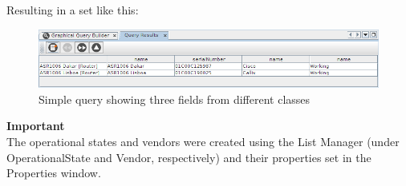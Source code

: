 \documentclass[a4paper]{article}
\begin{document}
	Resulting in a set like this:
	\begin{figure}[h!]
		\centering
		\includegraphics[width=0.9\linewidth]{img/query_results_multimple_nodes.png}
		\caption{Simple query showing three fields from different classes}
		\label{fig:query_results_multiple_nodes}
	\end{figure}
	\begin{framed} {\large \textbf{Important}}\\
		The operational states and vendors were created using the List Manager (under OperationalState and Vendor, respectively) and their properties set in the Properties window.
	\end{framed}			
	
\end{document}

